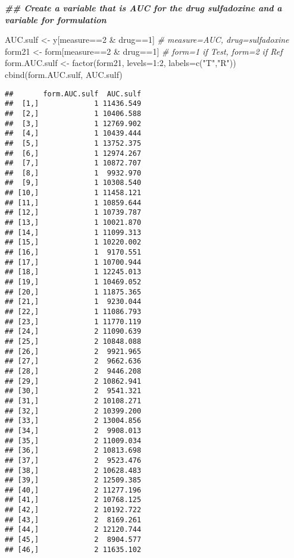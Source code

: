 \documentclass[
]{article}
\newenvironment{Shaded}{\begin{snugshade}}{\end{snugshade}}
\newcommand{\AttributeTok}[1]{\textcolor[rgb]{0.77,0.63,0.00}{#1}}
\newcommand{\CommentTok}[1]{\textcolor[rgb]{0.56,0.35,0.01}{\textit{#1}}}
\newcommand{\DecValTok}[1]{\textcolor[rgb]{0.00,0.00,0.81}{#1}}
\newcommand{\DocumentationTok}[1]{\textcolor[rgb]{0.56,0.35,0.01}{\textbf{\textit{#1}}}}
\newcommand{\FunctionTok}[1]{\textcolor[rgb]{0.00,0.00,0.00}{#1}}
\newcommand{\NormalTok}[1]{#1}
\newcommand{\OtherTok}[1]{\textcolor[rgb]{0.56,0.35,0.01}{#1}}
\newcommand{\SpecialCharTok}[1]{\textcolor[rgb]{0.00,0.00,0.00}{#1}}
\newcommand{\StringTok}[1]{\textcolor[rgb]{0.31,0.60,0.02}{#1}}
\begin{document}
\begin{Shaded}
\begin{Highlighting}[]
\DocumentationTok{\#\# Create a variable that is AUC for the drug sulfadoxine and a variable for formulation}

\NormalTok{AUC.sulf }\OtherTok{\textless{}{-}}\NormalTok{ y[measure}\SpecialCharTok{==}\DecValTok{2} \SpecialCharTok{\&}\NormalTok{ drug}\SpecialCharTok{==}\DecValTok{1}\NormalTok{]       }\CommentTok{\# measure=AUC, drug=sulfadoxine}
\NormalTok{form21 }\OtherTok{\textless{}{-}}\NormalTok{ form[measure}\SpecialCharTok{==}\DecValTok{2} \SpecialCharTok{\&}\NormalTok{ drug}\SpecialCharTok{==}\DecValTok{1}\NormalTok{]               }\CommentTok{\# form=1 if Test, form=2 if Ref}
\NormalTok{form.AUC.sulf }\OtherTok{\textless{}{-}} \FunctionTok{factor}\NormalTok{(form21, }\AttributeTok{levels=}\DecValTok{1}\SpecialCharTok{:}\DecValTok{2}\NormalTok{, }\AttributeTok{labels=}\FunctionTok{c}\NormalTok{(}\StringTok{"T"}\NormalTok{,}\StringTok{"R"}\NormalTok{))}
\FunctionTok{cbind}\NormalTok{(form.AUC.sulf, AUC.sulf)}
\end{Highlighting}
\end{Shaded}

\begin{verbatim}
##       form.AUC.sulf  AUC.sulf
##  [1,]             1 11436.549
##  [2,]             1 10406.588
##  [3,]             1 12769.902
##  [4,]             1 10439.444
##  [5,]             1 13752.375
##  [6,]             1 12974.267
##  [7,]             1 10872.707
##  [8,]             1  9932.970
##  [9,]             1 10308.540
## [10,]             1 11458.121
## [11,]             1 10859.644
## [12,]             1 10739.787
## [13,]             1 10021.870
## [14,]             1 11099.313
## [15,]             1 10220.002
## [16,]             1  9170.551
## [17,]             1 10700.944
## [18,]             1 12245.013
## [19,]             1 10469.052
## [20,]             1 11875.365
## [21,]             1  9230.044
## [22,]             1 11086.793
## [23,]             1 11770.119
## [24,]             2 11090.639
## [25,]             2 10848.088
## [26,]             2  9921.965
## [27,]             2  9662.636
## [28,]             2  9446.208
## [29,]             2 10862.941
## [30,]             2  9541.321
## [31,]             2 10108.271
## [32,]             2 10399.200
## [33,]             2 13004.856
## [34,]             2  9908.013
## [35,]             2 11009.034
## [36,]             2 10813.698
## [37,]             2  9523.476
## [38,]             2 10628.483
## [39,]             2 12509.385
## [40,]             2 11277.196
## [41,]             2 10768.125
## [42,]             2 10192.722
## [43,]             2  8169.261
## [44,]             2 12120.744
## [45,]             2  8904.577
## [46,]             2 11635.102
\end{verbatim}
\end{document}
